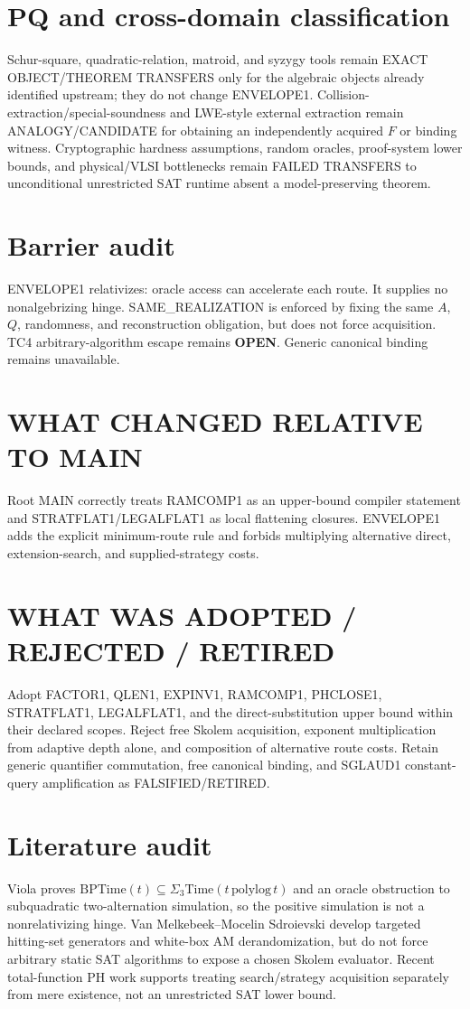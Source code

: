 \documentclass[11pt]{article}
\begin{document}
\section*{PQ and cross-domain classification}
Schur-square, quadratic-relation, matroid, and syzygy tools remain EXACT OBJECT/THEOREM TRANSFERS only for the algebraic objects already identified upstream; they do not change ENVELOPE1. Collision-extraction/special-soundness and LWE-style external extraction remain ANALOGY/CANDIDATE for obtaining an independently acquired $F$ or binding witness. Cryptographic hardness assumptions, random oracles, proof-system lower bounds, and physical/VLSI bottlenecks remain FAILED TRANSFERS to unconditional unrestricted SAT runtime absent a model-preserving theorem.
\section*{Barrier audit}
ENVELOPE1 relativizes: oracle access can accelerate each route. It supplies no nonalgebrizing hinge. SAME\_REALIZATION is enforced by fixing the same $A$, $Q$, randomness, and reconstruction obligation, but does not force acquisition. TC4 arbitrary-algorithm escape remains \textbf{OPEN}. Generic canonical binding remains unavailable.
\section*{WHAT CHANGED RELATIVE TO MAIN}
Root MAIN correctly treats RAMCOMP1 as an upper-bound compiler statement and STRATFLAT1/LEGALFLAT1 as local flattening closures. ENVELOPE1 adds the explicit minimum-route rule and forbids multiplying alternative direct, extension-search, and supplied-strategy costs.
\section*{WHAT WAS ADOPTED / REJECTED / RETIRED}
Adopt FACTOR1, QLEN1, EXPINV1, RAMCOMP1, PHCLOSE1, STRATFLAT1, LEGALFLAT1, and the direct-substitution upper bound within their declared scopes. Reject free Skolem acquisition, exponent multiplication from adaptive depth alone, and composition of alternative route costs. Retain generic quantifier commutation, free canonical binding, and SGLAUD1 constant-query amplification as FALSIFIED/RETIRED.
\section*{Literature audit}
Viola proves $\mathrm{BPTime}(t)\subseteq\Sigma_3\mathrm{Time}(t\,\mathrm{polylog}\,t)$ and an oracle obstruction to subquadratic two-alternation simulation, so the positive simulation is not a nonrelativizing hinge. Van Melkebeek--Mocelin Sdroievski develop targeted hitting-set generators and white-box AM derandomization, but do not force arbitrary static SAT algorithms to expose a chosen Skolem evaluator. Recent total-function PH work supports treating search/strategy acquisition separately from mere existence, not an unrestricted SAT lower bound.
\end{document}
